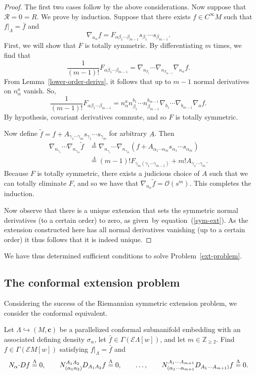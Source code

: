 \documentclass[pdftex]{sigma}
\numberwithin{equation}{section}
\newcommand{\ce}{\mathcal{E}}
\newcommand{\cc}{\boldsymbol{c}}
\renewcommand{\=}{\stackrel \Lambda =}
\newcommand{\csdot}{\hspace{-0.75mm} \cdot \hspace{-0.75mm}}
\begin{document}
\begin{proof}
The first two cases follow by the above considerations. Now suppose that $\mathcal{R} = 0 = R$. We prove by induction. Suppose that there exists $f \in C^\infty M$ such that $f|_{\Lambda} = \bar{f}$ and
\[\nabla_{n_{\alpha}} f = F_{\alpha \beta_1 \cdots \beta_{m-1}} s_{\beta_1} \cdots s_{\beta_{m-1}} .\]
First, we will show that $F$ is totally symmetric. By differentiating $m$ times, we find that
\[\frac{1}{(m-1)!} F_{\alpha \beta_1 \cdots \beta_{m-1}} = \nabla_{n_{\beta_1}} \cdots \nabla_{n_{\beta_{m-1}}} \nabla_{n_{\alpha}} f .\]
From Lemma~\ref{lower-order-derivs}, it follows that up to $m-1$ normal derivatives on $n^a_{\alpha}$ vanish. So,
\[\frac{1}{(m-1)!} F_{\alpha \beta_1 \cdots \beta_{m-1}} = n^a_{\alpha} n^{b_1}_{\beta_1} \cdots n^{b_{m-1}}_{\beta_{m-1}} \nabla_{b_1} \cdots \nabla_{b_{m-1}} \nabla_a f .\]
By hypothesis, covariant derivatives commute, and so $F$ is totally symmetric.

Now define $\tilde{f} = f + A_{\gamma_1 \cdots \gamma_{m}} s_{\gamma_1} \cdots s_{\gamma_{m}}$ for arbitrary $A$. Then
\begin{align*}
 \nabla_{n_{\gamma_1}} \cdots \nabla_{n_{\gamma_{m}}} \tilde{f} &\= \nabla_{n_{\gamma_1}} \cdots \nabla_{n_{\gamma_{m}}} (f + A_{\alpha_1 \cdots \alpha_{m}} s_{\alpha_1} \cdots s_{\alpha_{m}}) \\
&\= (m-1)! F_{\gamma_{m} (\gamma_1 \cdots \gamma_{m-1})} + m! A_{\gamma_1 \cdots \gamma_{m}} .
\end{align*}
Because $F$ is totally symmetric, there exists a judicious choice of $A$ such that we can totally eliminate $F$, and so we have that $\nabla_{n_{\alpha}} \tilde{f} = \mathcal{O}(s^m)$. This completes the induction.

Now observe that there is a unique extension that sets the symmetric normal derivatives (to a certain order) to zero, as given~by equation~(\ref{sym-ext}). As the extension constructed here has all normal derivatives vanishing (up to a certain order) it thus follows that it is indeed unique.
\end{proof}

We have thus determined sufficient conditions to solve Problem~\ref{ext-problem}.

\subsection{The conformal extension problem} %
Considering the success of the Riemannian symmetric extension problem, we consider the conformal equivalent.
\begin{Problem} \label{conformal-ext-problem}
Let $\Lambda \hookrightarrow (M,\cc)$ be a parallelized conformal submanifold embedding with an associated defining density $\sigma_{\alpha}$, let $\bar{f} \in \Gamma(\ce \Lambda[w])$, and let $m \in \mathbb{Z}_{\geq 2}$.
Find $f \in \Gamma(\ce M[w])$ satisfying $f|_{\Lambda} = \bar{f}$ and
\[N_{\alpha} \csdot D f \= 0 , \qquad N^{A_1 A_2}_{(\alpha_1 \alpha_2)} D_{A_1 A_2} f \= 0 , \qquad \ldots , \qquad N^{A_1 \cdots A_{m+1}}_{(\alpha_1 \cdots \alpha_{m+1}} D_{A_1 \cdots A_{m+1})}f \= 0 .\]
\end{Problem}
\end{document}
